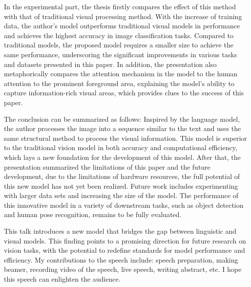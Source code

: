 \documentclass{article}
\begin{document}
In the experimental part, the thesis firstly compares the effect of this method with that of traditional visual processing method. With the increase of training data, the author's model outperforms traditional visual models in performance and achieves the highest accuracy in image classification tasks. Compared to traditional models, the proposed model requires a smaller size to achieve the same performance, underscoring the significant improvements in various tasks and datasets presented in this paper. In addition, the presentation also metaphorically compares the attention mechanism in the model to the human attention to the prominent foreground area, explaining the model's ability to capture information-rich visual areas, which provides clues to the success of this paper.

The conclusion can be summarized as follows: Inspired by the language model, the author processes the image into a sequence similar to the text and uses the same structural method to process the visual information. This model is superior to the traditional vision model in both accuracy and computational efficiency, which lays a new foundation for the development of this model. After that, the presentation summarized the limitations of this paper and the future development, due to the limitations of hardware resources, the full potential of this new model has not yet been realized. Future work includes experimenting with larger data sets and increasing the size of the model. The performance of this innovative model in a variety of downstream tasks, such as object detection and human pose recognition, remains to be fully evaluated.

This talk introduces a new model that bridges the gap between linguistic and visual models. This finding points to a promising direction for future research on vision tasks, with the potential to redefine standards for model performance and efficiency. My contributions to the speech include: speech preparation, making beamer, recording video of the speech, live speech, writing abstract, etc. I hope this speech can enlighten the audience.
\end{document}
